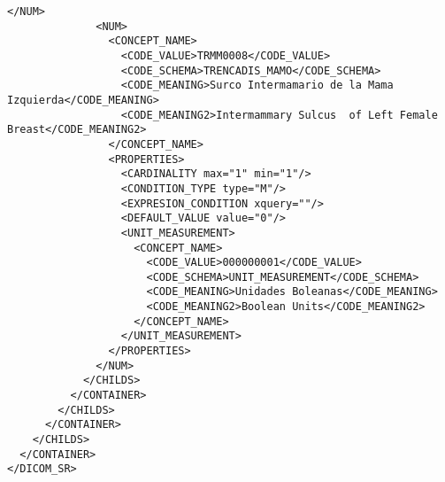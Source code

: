 \begin{lstlisting}[label=dicom-report,caption=Informe estructurado de una exploración de mama]
              </NUM>
              <NUM>
                <CONCEPT_NAME>
                  <CODE_VALUE>TRMM0008</CODE_VALUE>
                  <CODE_SCHEMA>TRENCADIS_MAMO</CODE_SCHEMA>
                  <CODE_MEANING>Surco Intermamario de la Mama Izquierda</CODE_MEANING>
                  <CODE_MEANING2>Intermammary Sulcus  of Left Female Breast</CODE_MEANING2>
                </CONCEPT_NAME>
                <PROPERTIES>
                  <CARDINALITY max="1" min="1"/>
                  <CONDITION_TYPE type="M"/>
                  <EXPRESION_CONDITION xquery=""/>
                  <DEFAULT_VALUE value="0"/>
                  <UNIT_MEASUREMENT>
                    <CONCEPT_NAME>
                      <CODE_VALUE>000000001</CODE_VALUE>
                      <CODE_SCHEMA>UNIT_MEASUREMENT</CODE_SCHEMA>
                      <CODE_MEANING>Unidades Boleanas</CODE_MEANING>
                      <CODE_MEANING2>Boolean Units</CODE_MEANING2>
                    </CONCEPT_NAME>
                  </UNIT_MEASUREMENT>
                </PROPERTIES>
              </NUM>
            </CHILDS>
          </CONTAINER>
        </CHILDS>
      </CONTAINER>
    </CHILDS>
  </CONTAINER>
</DICOM_SR>


\end{lstlisting}
